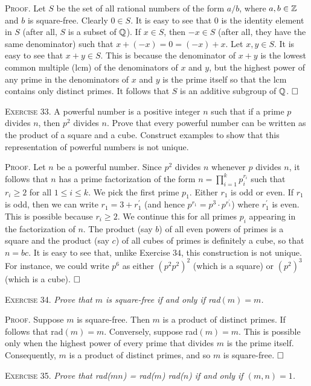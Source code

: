 \documentclass[11pt, leqno]{article}
\newcommand{\done}{\ensuremath{\hfill\square}}
\begin{document}
\textsc{Proof}. Let $S$ be the set of all rational numbers of the form $a/b$, where $a, b \in \mathbb{Z}$ and $b$ is square-free. Clearly $0 \in S$. It is easy to see that $0$ is the identity element in $S$ (after all, $S$ is a subset of $\mathbb{Q}$). If $x \in S$, then $-x \in S$ (after all, they have the same denominator) such that $x + (-x) = 0 = (-x) + x$. Let $x,y \in S$. It is easy to see that $x+y \in S$. This is because the denominator of $x+y$ is the lowest common multiple (lcm) of the denominators of $x$ and $y$, but the highest power of any prime in the denominators of $x$ and $y$ is the prime itself so that the lcm contains only distinct primes. It follows that $S$ is an additive subgroup of $\mathbb{Q}$. \done

\textsc{Exercise 33}. A powerful number is a positive integer $n$ such that if a prime $p$ divides $n$, then $p^2$ divides $n$. Prove that every powerful number can be written as the product of a square and a cube. Construct examples to show that this representation of powerful numbers is not unique.

\textsc{Proof}. Let $n$ be a powerful number. Since $p^2$ divides $n$ whenever $p$ divides $n$, it follows that $n$ has a prime factorization of the form $n = \prod_{i=1}^k p_i^{r_i}$ such that $r_i \geq 2$ for all $1 \leq i \leq k$. We pick the first prime $p_1$. Either $r_1$ is odd or even. If $r_1$ is odd, then we can write $r_1 = 3 + r_1^{\prime}$ (and hence $p^{r_1} = p^3\cdot p^{r_1^{\prime}}$) where $r_1^{\prime}$ is even. This is possible because $r_i \geq 2$. We continue this for all primes $p_i$ appearing in the factorization of $n$. The product (say $b$) of all even powers of primes is a square and the product (say $c$) of all cubes of primes is definitely a cube, so that $n = bc$. It is easy to see that, unlike Exercise $34$, this construction is not unique. For instance, we could write $p^6$ as either $(p^2p^2)^2$ (which is a square) or $(p^2)^3$ (which is a cube). \done

\textsc{Exercise 34}. \emph{Prove that $m$ is square-free if and only if \emph{rad}$(m) = m$.}

\textsc{Proof}. Suppose $m$ is square-free. Then $m$ is a product of distinct primes. If follows that rad$(m) = m$. Conversely, suppose rad$(m) = m$. This is possible only when the highest power of every prime that divides $m$ is the prime itself. Consequently, $m$ is a product of distinct primes, and so $m$ is square-free. \done

\textsc{Exercise 35}. \emph{Prove that \emph{rad($mn$)} = \emph{rad($m$)} \emph{rad($n$)} if and only if $(m, n) = 1$.}
\end{document}
